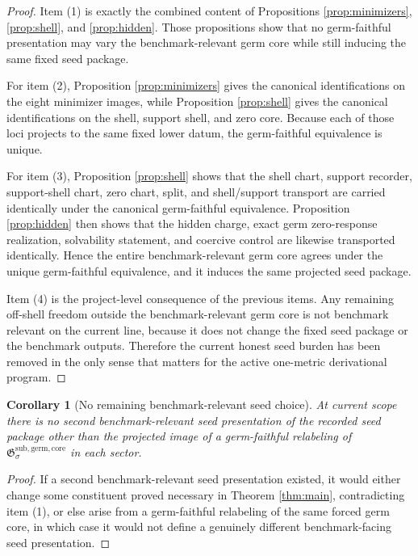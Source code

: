 \documentclass[11pt]{article}
\newcommand{\GermCore}{\mathfrak G^{\mathrm{sub,germ,core}}}
\newtheorem{corollary}{Corollary}
\begin{document}
\begin{proof}
Item (1) is exactly the combined content of Propositions \ref{prop:minimizers}, \ref{prop:shell}, and \ref{prop:hidden}. Those propositions show that no germ-faithful presentation may vary the benchmark-relevant germ core while still inducing the same fixed seed package.

For item (2), Proposition \ref{prop:minimizers} gives the canonical identifications on the eight minimizer images, while Proposition \ref{prop:shell} gives the canonical identifications on the shell, support shell, and zero core. Because each of those loci projects to the same fixed lower datum, the germ-faithful equivalence is unique.

For item (3), Proposition \ref{prop:shell} shows that the shell chart, support recorder, support-shell chart, zero chart, split, and shell/support transport are carried identically under the canonical germ-faithful equivalence. Proposition \ref{prop:hidden} then shows that the hidden charge, exact germ zero-response realization, solvability statement, and coercive control are likewise transported identically. Hence the entire benchmark-relevant germ core agrees under the unique germ-faithful equivalence, and it induces the same projected seed package.

Item (4) is the project-level consequence of the previous items. Any remaining off-shell freedom outside the benchmark-relevant germ core is not benchmark relevant on the current line, because it does not change the fixed seed package or the benchmark outputs. Therefore the current honest seed burden has been removed in the only sense that matters for the active one-metric derivational program.
\end{proof}

\begin{corollary}[No remaining benchmark-relevant seed choice]
\label{cor:nofreedom}
At current scope there is no second benchmark-relevant seed presentation of the recorded seed package other than the projected image of a germ-faithful relabeling of \(\GermCore_{\sigma}\) in each sector.
\end{corollary}

\begin{proof}
If a second benchmark-relevant seed presentation existed, it would either change some constituent proved necessary in Theorem \ref{thm:main}, contradicting item (1), or else arise from a germ-faithful relabeling of the same forced germ core, in which case it would not define a genuinely different benchmark-facing seed presentation.
\end{proof}
\end{document}
